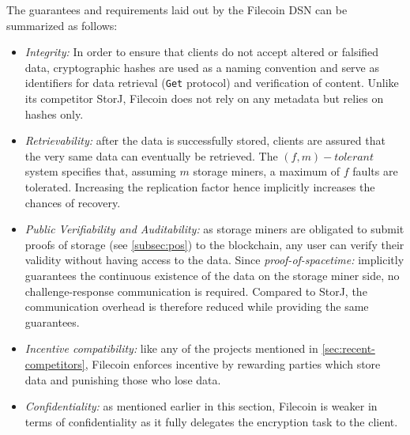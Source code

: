 \documentclass[conference]{IEEEtran}
\begin{document}
The guarantees and requirements laid out by the Filecoin DSN can be summarized as follows:
\begin{itemize}
\item \textit{Integrity:} In order to ensure that clients do not accept altered or falsified data, cryptographic hashes are used as a naming convention and serve as identifiers for data retrieval (\texttt{Get} protocol) and verification of content.
Unlike its competitor StorJ\cite{storj}, Filecoin does not rely on any metadata but relies on hashes only.
\item \textit{Retrievability:} after the data is successfully stored, clients are assured that the very same data can eventually be retrieved.
The $(f, m)-tolerant$ system specifies that, assuming $m$ storage miners, a maximum of $f$ faults are tolerated.
Increasing the replication factor hence implicitly increases the chances of recovery.
\item \textit{Public Verifiability and Auditability:} as storage miners are obligated to submit proofs of storage (see \ref{subsec:pos}) to the blockchain, any user can verify their validity without having access to the data.
Since \textit{proof-of-spacetime:} implicitly guarantees the continuous existence of the data on the storage miner side, no challenge-response communication is required.
Compared to StorJ\cite{storj}, the communication overhead is therefore reduced while providing the same guarantees.
\item \textit{Incentive compatibility:} like any of the projects mentioned in \ref{sec:recent-competitors}, Filecoin enforces incentive by rewarding parties which store data and punishing those who lose data.
\item \textit{Confidentiality:} as mentioned earlier in this section, Filecoin is weaker in terms of confidentiality as it fully delegates the encryption task to the client.
\end{itemize}

\end{document}
